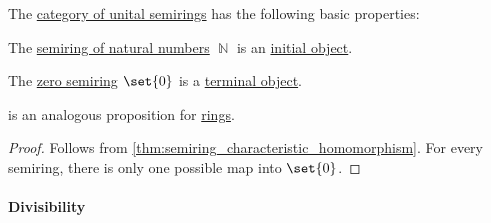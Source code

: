 \begin{proposition}\label{thm:category_of_semirings_properties}
  The \hyperref[def:semiring/category]{category of unital semirings} has the following basic properties:
  \begin{thmenum}
     The \hyperref[def:natural_numbers]{semiring of natural numbers} \( \BbbN \) is an \hyperref[def:universal_objects/initial]{initial object}.

     The \hyperref[def:semiring/trivial]{zero semiring} \( \set{ 0 } \) is a \hyperref[def:universal_objects/terminal]{terminal object}.
  \end{thmenum}
\end{proposition}
\begin{comments}
  \item {} is an analogous proposition for \hyperref[def:ring]{rings}.
\end{comments}
\begin{proof}
   Follows from \cref{thm:semiring_characteristic_homomorphism}.
   For every semiring, there is only one possible map into \( \set{ 0 } \).
\end{proof}

\paragraph{Divisibility}

